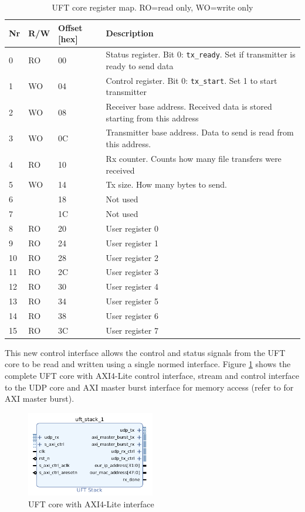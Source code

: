 \begin{table}[tb!]
    \centering
    \begin{tabular}{l l l p{10cm}}
        \toprule
		Nr & R/W & Offset [hex] & Description \\
        \midrule
		0 & RO & 00 & Status register. Bit 0: \texttt{tx\_ready}. Set if transmitter is
		ready to send data \\
		1 & WO & 04 & Control register. Bit 0: \texttt{tx\_start}. Set 1 to start
		transmitter \\
		2 & WO & 08 & Receiver base address. Received data is stored starting from this
		address \\
		3 & WO & 0C & Transmitter base address. Data to send is read from this address.
		\\
		4 & RO & 10 & Rx counter. Counts how many file transfers were received \\
		5 & WO & 14 & Tx size. How many bytes to send. \\
		6 & & 18 &  Not used\\
		7 & & 1C &  Not used\\
		8 & RO & 20 & User register 0 \\
		9 & RO & 24 & User register 1 \\
		10 & RO & 28 & User register 2 \\
		11 & RO & 2C & User register 3 \\
		12 & RO & 30 & User register 4 \\
		13 & RO & 34 & User register 5 \\
		14 & RO & 38 & User register 6 \\
		15 & RO & 3C & User register 7 \\
        \bottomrule
    \end{tabular}
    \caption{UFT core register map. RO=read only, WO=write only}
    \label{tab:uftaxiregmap}
\end{table}

This new control interface allows the control and status signals from the UFT
core to be read and written using a single normed interface. Figure 
\ref{fig:uftcoreaxilite} shows the complete UFT core with AXI4-Lite control
interface, stream and control interface to the UDP core and AXI master burst
interface for memory access (refer to \cite{p5report} for AXI master burst).

\begin{figure}[b!]
    \centering
    \includegraphics[width=0.5\textwidth] {images/dataflow/uftcoreaxilite.png}
    \caption{UFT core with AXI4-Lite interface}
    \label{fig:uftcoreaxilite}
\end{figure}

